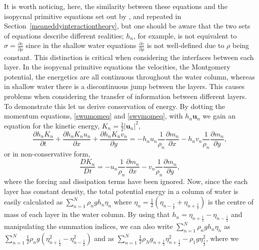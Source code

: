 \documentclass[12pt,a4paper]{report}
\newcommand*\secref[1]{Section~\ref{#1}}
\newcommand*{\half}{\frac{1}{2}}
\begin{document}
   It is worth noticing, here, the similarity between these equations and the isopycnal
    primitive    equations set out by \cite{young2012exact}, and repeated in  \secref{meaneddyinteractiontheory}, but one should be aware that
    the two sets of equations describe different realities; $h_{n}$, for example, is not
    equivalent to $\sigma = \frac{\partial z}{\partial \rho}$ since in the shallow water
    equations $\frac{\partial z}{\partial \rho}$ is not well-defined due to  $\rho$ being
    constant. This distinction is critical when considering the interfaces between each
    layer. In the isopycnal primitive equations the velocities, the Montgomery potential, 
    the energetics are all continuous throughout the water column, whereas in shallow 
    water there is a discontinuous jump between the layers. This causes problems when
    considering the transfer of information between different layers. To demonstrate this
    let us derive conservation of energy. By dotting the momentum equations, \ref{swumomeq}
    and \ref{swvmomeq}, with $h_{n}\boldsymbol{u}_{n}$ we gain an equation for the kinetic 
    energy, $K_{n}=\half \left|\boldsymbol{u}_{n}\right|^{2}$,
    \begin{equation}
    \label{swkeeq}
    \frac{\partial h_{n} K_{n}}{\partial t} + \frac{\partial h_{n} K_{n} u_{n}}{\partial x}+
    \frac{\partial h_{n} K_{n} v_{n} }{\partial y} = - h_{n} u_{n}\frac{1}{\rho_{n}}   \frac{\partial m_{n}}{\partial x} - h_{n} v_{n}\frac{1}{\rho_{n}}   \frac{\partial m_{n}}{\partial y},
    \end{equation}
    or in non-conservative form, 
    \begin{equation}
    \frac{D  K_{n}}{D t}  = - u_{n}\frac{1}{\rho_{n}}   \frac{\partial m_{n}}{\partial x} - v_{n}\frac{1}{\rho_{n}}   \frac{\partial m_{n}}{\partial y},
    \end{equation}
    where the forcing and dissipation terms have been ignored. Now, since the
    each layer has constant density, the total potential energy in a column
    of water is easily calculated as $\sum_{n=1}^{N} \rho_{n} g h_{n}\eta_{n}$ where
    $\eta_{n}=\half  \left(\eta_{n-\half }+\eta_{n+\half }\right)$ is
    the centre of mass of each layer in the water column. By using that $h_{n} = \eta_{n+\half }-\eta_{n-\half }$ and manipulating the summation
    indices, we can also write $\sum_{n=1}^{N} \rho_{n} g h_{n}\eta_{n}$ as
    $\sum_{n=1}^{N}\half  \rho_{n} g \left(\eta_{n+\half }^{2}-\eta_{n-\half }^{2}\right)$
    and as $\sum_{n=1}^{N}\half  \rho_{N} g_{n+\half } \eta_{n+\half }^{2}-\rho_{1}g\eta_{\half }^{2}$, where we 
\end{document}

